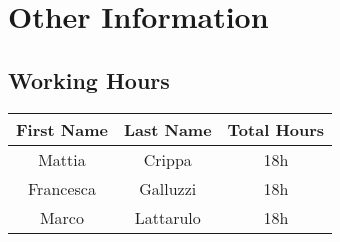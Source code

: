 \chapter{Other Information} \label{chap3}

\section{Working Hours}

\begin{table}[htbp]
\begin{center}
\begin{tabular}[t]{ccc}

\hline
\textbf{First Name} & \textbf{Last Name} & \textbf{Total Hours} \\
\hline
Mattia & Crippa &  18h\\
\hline
Francesca & Galluzzi &  18h\\
\hline
Marco & Lattarulo & 18h\\
\hline

\end{tabular}
\end{center}
\end{table}